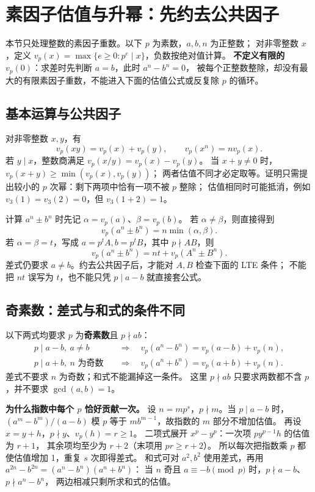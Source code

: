 \section{素因子估值与升幂：先约去公共因子}\label{knowledge-lte}
本节只处理整数的素因子重数。以下 $p$ 为素数，$a,b,n$ 为正整数；
对非零整数 $x$，定义 $v_p(x)=\max\{e\ge0:p^e\mid x\}$，负数按绝对值计算。
\textbf{不定义有限的 $v_p(0)$}：求差时先判断 $a=b$，此时 $a^n-b^n=0$，
被每个正整数整除，却没有最大的有限素因子重数，不能进入下面的估值公式或反复除 $p$ 的循环。

\subsection{基本运算与公共因子}
对非零整数 $x,y$，有
\[
v_p(xy)=v_p(x)+v_p(y),\qquad v_p(x^n)=n v_p(x).
\]
若 $y\mid x$，整数商满足 $v_p(x/y)=v_p(x)-v_p(y)$。
当 $x+y\ne0$ 时，$v_p(x+y)\ge\min(v_p(x),v_p(y))$；
两者估值不同才必定取等。证明只需提出较小的 $p$ 次幂：剩下两项中恰有一项不被 $p$ 整除；
估值相同时可能抵消，例如 $v_3(1)=v_3(2)=0$，但 $v_3(1+2)=1$。

计算 $a^n\pm b^n$ 时先记 $\alpha=v_p(a)$、$\beta=v_p(b)$。
若 $\alpha\ne\beta$，则直接得到
\[
v_p(a^n\pm b^n)=n\min(\alpha,\beta).
\]
若 $\alpha=\beta=t$，写成 $a=p^tA,b=p^tB$，其中 $p\nmid AB$，则
\[
v_p(a^n\pm b^n)=nt+v_p(A^n\pm B^n).
\]
差式仍要求 $a\ne b$。约去公共因子后，才能对 $A,B$ 检查下面的 LTE 条件；
不能把 $nt$ 误写为 $t$，也不能只凭 $p\mid a-b$ 就直接套公式。

\subsection{奇素数：差式与和式的条件不同}
以下两式均要求 $p$ 为\textbf{奇素数}且 $p\nmid ab$：
\[
\begin{aligned}
p\mid a-b,\ a\ne b
&\quad\Longrightarrow\quad v_p(a^n-b^n)=v_p(a-b)+v_p(n),\\
p\mid a+b,\ n\text{ 为奇数}
&\quad\Longrightarrow\quad v_p(a^n+b^n)=v_p(a+b)+v_p(n).
\end{aligned}
\]
差式不要求 $n$ 为奇数；和式不能漏掉这一条件。
这里 $p\nmid ab$ 只要求两数都不含 $p$，并不要求 $\gcd(a,b)=1$。

\textbf{为什么指数中每个 $p$ 恰好贡献一次。}
设 $n=mp^s$，$p\nmid m$。当 $p\mid a-b$ 时，
$(a^m-b^m)/(a-b)$ 模 $p$ 等于 $mb^{m-1}$，故指数的 $m$ 部分不增加估值。
再设 $x=y+h$，$p\nmid y$、$v_p(h)=r\ge1$。
二项式展开 $x^p-y^p$：一次项 $py^{p-1}h$ 的估值为 $r+1$，
其余项均至少为 $r+2$（末项用 $pr\ge r+2$）。
所以每次把指数乘 $p$ 都使估值增加 1，重复 $s$ 次即得差式。
和式可对 $a^2,b^2$ 使用差式，再用
$a^{2n}-b^{2n}=(a^n-b^n)(a^n+b^n)$：
当 $n$ 奇且 $a\equiv-b\pmod p$ 时，$p\nmid a-b$、$p\nmid a^n-b^n$，
两边相减只剩所求和式的估值。

